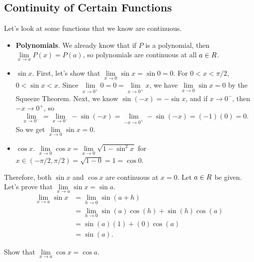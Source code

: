 \subsection{Continuity of Certain Functions}
Let's look at some functions that we know are continuous.
\begin{itemize}
    \item \textbf{Polynomials}. We already know that if $ P $ is a polynomial, then $ \lim\limits_{{x} \to {a}}P(x)=P(a) $,
          so polynomials are continuous at all $ a\in\relax{R} $.
    \item $ \sin x $. First, let's show that $ \lim\limits_{{x} \to {0}}\sin x=\sin 0=0 $.
          For $ 0<x<\pi/2 $, $ 0<\sin x<x $. Since $ \lim\limits_{{x} \to {0^+}}0=0=\lim\limits_{{x} \to {0^+}}x $,
          we have $ \lim\limits_{{x} \to {0}}\sin x=0 $ by the Squeeze Theorem. Next, we know $ \sin(-x)=-\sin x $, and if $ x\to 0^- $,
          then $ -x\to 0^+ $, so
          \[ \lim\limits_{{x} \to {0^-}}=\lim\limits_{{x} \to {0^-}}-\sin(-x)=\lim\limits_{{-x} \to {0^+}}-\sin(-x)=(-1)(0)=0. \]
          So we get $ \lim\limits_{{x} \to {0}}\sin x=0 $.
    \item $ \cos x $. $ \lim\limits_{{x} \to {0}}\cos x=\lim\limits_{{x} \to {0}}\sqrt{1-\sin^2 x} $ for $ x\in(-\pi/2,\pi/2)=\sqrt{1-0}=1=\cos 0 $.
\end{itemize}
Therefore, both $ \sin x $ and $ \cos x $ are continuous at $ x=0 $. Let $ a\in\relax{R} $ be given. Let's prove that $ \lim\limits_{{x} \to {a}}\sin x=\sin a $.
\begin{align*}
    \lim\limits_{{x} \to {a}}\sin x
     & =\lim\limits_{{h} \to {0}}\sin(a+h)                     \\
     & =\lim\limits_{{h} \to {0}}\sin(a)\cos(h)+\sin(h)\cos(a) \\
     & =\sin(a)(1)+(0)\cos(a)                                  \\
     & =\sin(a).
\end{align*}
\begin{Exercise}{}{}
    Show that $ \lim\limits_{{x} \to {a}}\cos x=\cos a $.
\end{Exercise}
